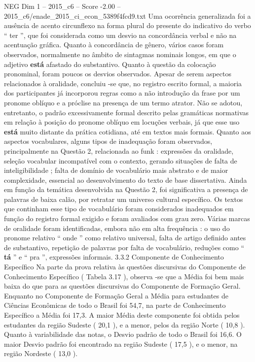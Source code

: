 \begin{textsample}{NEG Dim 1 – 2015\_c6 – Score -2.00 – 2015\_c6/enade\_2015\_ci\_econ\_5389f4fcd9.txt}
Uma ocorrência generalizada foi a ausência de acento circunflexo na forma plural do presente do indicativo do verbo “ ter ”, que foi considerada como um desvio na concordância verbal e não na acentuação gráfica.
Quanto à concordância de gênero, vários casos foram observados, normalmente no âmbito de sintagmas nominais longos, em que o adjetivo \textbf{está} afastado do substantivo.
Quanto à questão da colocação pronominal, foram poucos os desvios observados.
Apesar de serem aspectos relacionados à oralidade, concluiu -se que, no registro escrito formal, a maioria dos participantes já incorporou regras como a não introdução da frase por um pronome oblíquo e a próclise na presença de um termo atrator.
Não se adotou, entretanto, o padrão excessivamente formal descrito pelas gramáticas normativas em relação à posição do pronome oblíquo em locuções verbais, já que esse uso \textbf{está} muito distante da prática cotidiana, até em textos mais formais.
Quanto aos aspectos vocabulares, alguns tipos de inadequação foram observados, principalmente na Questão 2, relacionada ao funk : expressões da oralidade, seleção vocabular incompatível com o contexto, gerando situações de falta de inteligibilidade ; falta de domínio de vocabulário mais abstrato e de maior complexidade, essencial ao desenvolvimento do texto de base dissertativa.
Ainda em função da temática desenvolvida na Questão 2, foi significativa a presença de palavras de baixa calão, por retratar um universo cultural específico.
Os textos que continham esse tipo de vocabulário foram considerados inadequados em função do registro formal exigido e foram avaliados com grau zero.
Várias marcas de oralidade foram identificadas, embora não em alta frequência : o uso do pronome relativo “ onde ” como relativo universal, falta de artigo definido antes de substantivo, repetição de palavras por falta de vocabulário, reduções como “ \textbf{tá} ” e “ pra ”, expressões informais. 3.3.2 Componente de Conhecimento Específico Na parte da prova relativa às questões discursivas do Componente de Conhecimento Específico ( Tabela 3.17 ), observa -se que a Média foi bem mais baixa do que para as questões discursivas do Componente de Formação Geral.
Enquanto no Componente de Formação Geral a Média para estudantes de Ciências Econômicas de todo o Brasil foi 54,7, na parte de Conhecimento Específico a Média foi 17,3.
A maior Média deste componente foi obtida pelos estudantes da região Sudeste ( 20,1 ), e a menor, pelos da região Norte ( 10,8 ).
Quanto à variabilidade das notas, o Desvio padrão de todo o Brasil foi 16,6.
O maior Desvio padrão foi encontrado na região Sudeste ( 17,5 ), e o menor, na região Nordeste ( 13,0 ).

\end{textsample}
